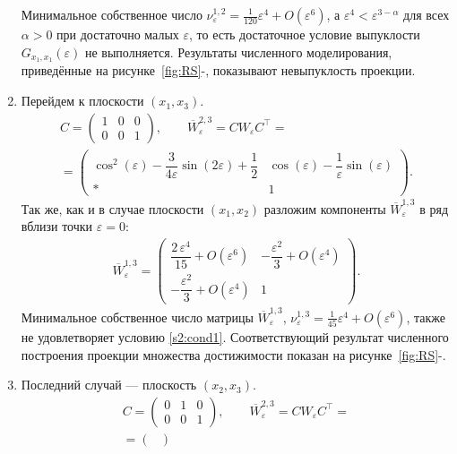 \documentclass[../main.tex]{subfiles}
\begin{document}
\begin{enumerate}
 Минимальное собственное число $ \nu^{1,2}_{\varepsilon} = \frac{1}{120}\varepsilon^4 + O(\varepsilon^6)$, а $ \varepsilon^4 < \varepsilon^{3-\alpha} $ для всех $ \alpha > 0 $ при достаточно малых $ \varepsilon $, то есть достаточное условие выпуклости $ G_{x_1, x_1}(\varepsilon) $ не выполняется. 
Результаты численного моделирования, приведённые на рисунке~\ref{fig:RS}-, показывают невыпуклость проекции. 
 \item Перейдем к плоскости $ (x_1,x_3) $. 
 \begin{gather*}
 C = \begin{pmatrix}
 1 & 0 & 0 \\
 0 & 0 & 1
 \end{pmatrix}, \qquad
 \overline{W}_{\varepsilon}^{2,3} = C W_{\varepsilon} C^{\top} = \\ =\begin{pmatrix}
 \cos^2(\varepsilon)-\dfrac{3}{4\varepsilon}\sin(2\varepsilon)+\dfrac{1}{2} & 
 \cos\left(\varepsilon \right)-\dfrac{1}{\varepsilon} \sin\left(\varepsilon \right) \\ 
 * & 1
 \end{pmatrix}.
 \end{gather*}
 Так же, как и в случае плоскости $ (x_1,x_2) $ разложим компоненты $ \overline{W}_{\varepsilon}^{1,3} $ в ряд вблизи точки $ \varepsilon = 0 $:
 \begin{gather*}
 \overline{W}_{\varepsilon}^{1,3} = \begin{pmatrix} 
 \dfrac{2\,\varepsilon ^4}{15} + O(\varepsilon^6) &
 -\dfrac{\varepsilon^2}{3}+ O(\varepsilon ^4)\\[8pt]
 -\dfrac{\varepsilon^2}{3} + O(\varepsilon^4) & 1 \end{pmatrix}.
 \end{gather*}
 Минимальное собственное число матрицы $ \overline{W}_{\varepsilon}^{1,3} $, $ \nu^{1,3}_{\varepsilon} = \frac{1}{45}\varepsilon^4 + O(\varepsilon^6) $, также не удовлетворяет условию \eqref{s2:cond1}. 
Соответствующий результат численного построения проекции множества достижимости показан на рисунке~\ref{fig:RS}-.
 \item Последний случай --- плоскость $ (x_2,x_3) $.
 \begin{gather*}
 C = \begin{pmatrix}
 0 & 1 & 0 \\
 0 & 0 & 1
 \end{pmatrix}, \qquad
 \overline{W}_{\varepsilon}^{2,3} = C W_{\varepsilon} C^{\top} =\\=\begin{pmatrix}

\end{pmatrix}
\end{gather*}
\end{enumerate}
\end{document}
